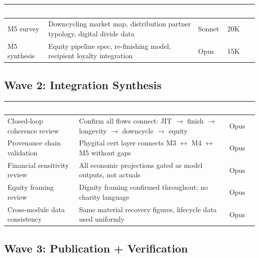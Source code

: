 \documentclass[11pt,letterpaper]{article}
\newcommand{\tableheader}[1]{\textbf{\sffamily\textcolor{white}{#1}}}
\begin{document}
\begin{center}
\begin{tabularx}{\textwidth}{L{3cm}XC{2cm}C{2cm}}
\toprule
{}
\tableheader{Task} & \tableheader{Output} & \tableheader{Model} & \tableheader{Tokens} \\
\midrule
M5 survey & Downcycling market map, distribution partner typology, digital divide data & Sonnet & 20K \\
M5 synthesis & Equity pipeline spec, re-finishing model, recipient loyalty integration & Opus & 15K \\
\bottomrule
\end{tabularx}
\end{center}

\subsection{Wave 2: Integration Synthesis}

\begin{center}
\begin{tabularx}{\textwidth}{L{4cm}XC{2cm}}
\toprule
{}
\tableheader{Task} & \tableheader{Output} & \tableheader{Model} \\
\midrule
Closed-loop coherence review & Confirm all flows connect: JIT $\to$ finish $\to$ longevity $\to$ downcycle $\to$ equity & Opus \\
Provenance chain validation & Phygital cert layer connects M3 $\leftrightarrow$ M4 $\leftrightarrow$ M5 without gaps & Opus \\
Financial sensitivity review & All economic projections gated as model outputs, not actuals & Opus \\
Equity framing review & Dignity framing confirmed throughout; no charity language & Opus \\
Cross-module data consistency & Same material recovery figures, lifecycle data used uniformly & Opus \\
\bottomrule
\end{tabularx}
\end{center}

\subsection{Wave 3: Publication + Verification}
\end{document}
